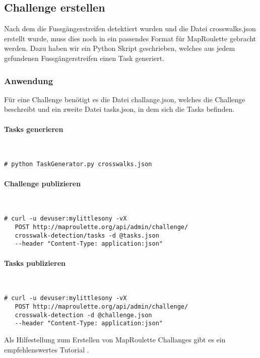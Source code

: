 \subsection{Challenge erstellen}
Nach dem die Fussgängerstreifen detektiert wurden und die Datei crosswalks.json erstellt wurde, muss dies noch in ein passendes Format für MapRoulette gebracht werden. Dazu haben wir ein Python Skript geschrieben, welches aus jedem gefundenen Fussgängerstreifen einen Task generiert.

\subsubsection{Anwendung}
Für eine Challenge benötigt es die Datei challange.json, welches die Challenge beschreibt und ein zweite Datei tasks.json, in dem sich die Tasks befinden.\\

\paragraph{Tasks generieren}\mbox{}\\
\begin{lstlisting}[style=BashInputStyle]
 # python TaskGenerator.py crosswalks.json
\end{lstlisting}

\paragraph{Challenge publizieren}\mbox{}\\
\begin{lstlisting}[style=BashInputStyle]
 # curl -u devuser:mylittlesony -vX
   POST http://maproulette.org/api/admin/challenge/
   crosswalk-detection/tasks -d @tasks.json
   --header "Content-Type: application:json"
\end{lstlisting}

\paragraph{Tasks publizieren}\mbox{}\\
\begin{lstlisting}[style=BashInputStyle]
 # curl -u devuser:mylittlesony -vX
   POST http://maproulette.org/api/admin/challenge/
   crosswalk-detection -d @challenge.json
   --header "Content-Type: application:json"
\end{lstlisting}


Als Hilfestellung zum Erstellen von MapRoulette Challanges gibt es ein empfehlenswertes Tutorial \cite{Tutorial}.


